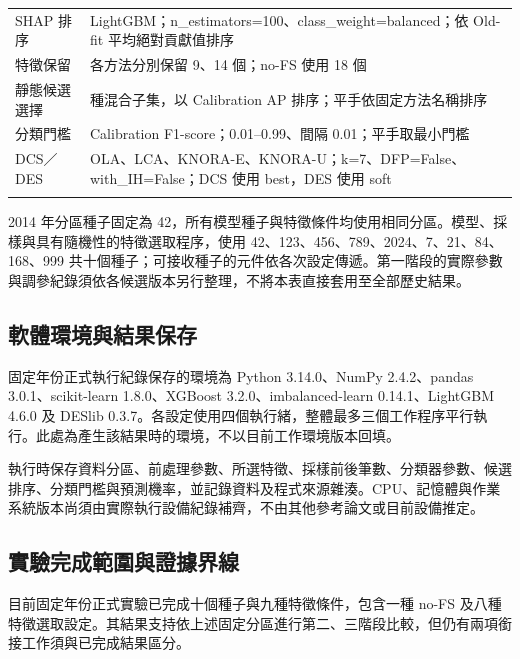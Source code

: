 \begin{longtable}{@{}>{\raggedright\arraybackslash}p{}>{\raggedright\arraybackslash}p{}@{}}
\addlinespace[2pt]
SHAP 排序 & LightGBM；{\normalfont n\_\allowbreak{}estimators=\allowbreak{}100}、{\normalfont class\_\allowbreak{}weight=\allowbreak{}balanced}；依 Old-fit 平均絕對貢獻值排序 \\
\addlinespace[2pt]
特徵保留 & 各方法分別保留 9、14 個；no-FS 使用 18 個 \\
\addlinespace[2pt]
靜態候選選擇 & 49 種混合子集，以 Calibration AP 排序；平手依固定方法名稱排序 \\
\addlinespace[2pt]
分類門檻 & Calibration F1-score；0.01–0.99、間隔 0.01；平手取最小門檻 \\
\addlinespace[2pt]
DCS／DES & OLA、LCA、KNORA-E、KNORA-U；{\normalfont k=\allowbreak{}7}、{\normalfont DFP=\allowbreak{}False}、{\normalfont with\_\allowbreak{}IH=\allowbreak{}False}；DCS 使用 {\normalfont best}，DES 使用 {\normalfont soft} \\*
\end{longtable}
\endgroup

2014 年分區種子固定為 42，所有模型種子與特徵條件均使用相同分區。模型、採樣與具有隨機性的特徵選取程序，使用 42、123、456、789、2024、7、21、84、168、999 共十個種子；可接收種子的元件依各次設定傳遞。第一階段的實際參數與調參紀錄須依各候選版本另行整理，不將本表直接套用至全部歷史結果。

\subsection{軟體環境與結果保存}

固定年份正式執行紀錄保存的環境為 Python 3.14.0、NumPy 2.4.2、pandas 3.0.1、scikit-learn 1.8.0、XGBoost 3.2.0、imbalanced-learn 0.14.1、LightGBM 4.6.0 及 DESlib 0.3.7。各設定使用四個執行緒，整體最多三個工作程序平行執行。此處為產生該結果時的環境，不以目前工作環境版本回填。

執行時保存資料分區、前處理參數、所選特徵、採樣前後筆數、分類器參數、候選排序、分類門檻與預測機率，並記錄資料及程式來源雜湊。CPU、記憶體與作業系統版本尚須由實際執行設備紀錄補齊，不由其他參考論文或目前設備推定。

\subsection{實驗完成範圍與證據界線}\label{sec:method-evidence}

目前固定年份正式實驗已完成十個種子與九種特徵條件，包含一種 no-FS 及八種特徵選取設定。其結果支持依上述固定分區進行第二、三階段比較，但仍有兩項銜接工作須與已完成結果區分。

